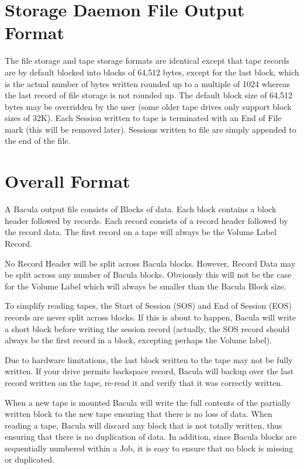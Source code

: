 \section{Storage Daemon File Output Format}

The file storage and tape storage formats are identical except that tape
records are by default blocked into blocks of 64,512 bytes, except for the
last block, which is the actual number of bytes written rounded up to a
multiple of 1024 whereas the last record of file storage is not rounded up.
The default block size of 64,512 bytes may be overridden by the user (some
older tape drives only support block sizes of 32K). Each Session written to
tape is terminated with an End of File mark (this will be removed later).
Sessions written to file are simply appended to the end of the file. 

\section{Overall Format}

A Bacula output file consists of Blocks of data. Each block contains a block
header followed by records. Each record consists of a record header followed
by the record data. The first record on a tape will always be the Volume Label
Record. 

No Record Header will be split across Bacula blocks. However, Record Data may
be split across any number of Bacula blocks. Obviously this will not be the
case for the Volume Label which will always be smaller than the Bacula Block
size. 

To simplify reading tapes, the Start of Session (SOS) and End of Session (EOS)
records are never split across blocks. If this is about to happen, Bacula will
write a short block before writing the session record (actually, the SOS
record should always be the first record in a block, excepting perhaps the
Volume label). 

Due to hardware limitations, the last block written to the tape may not be
fully written. If your drive permits backspace record, Bacula will backup over
the last record written on the tape, re-read it and verify that it was
correctly written. 

When a new tape is mounted Bacula will write the full contents of the
partially written block to the new tape ensuring that there is no loss of
data. When reading a tape, Bacula will discard any block that is not totally
written, thus ensuring that there is no duplication of data. In addition,
since Bacula blocks are sequentially numbered within a Job, it is easy to
ensure that no block is missing or duplicated. 

